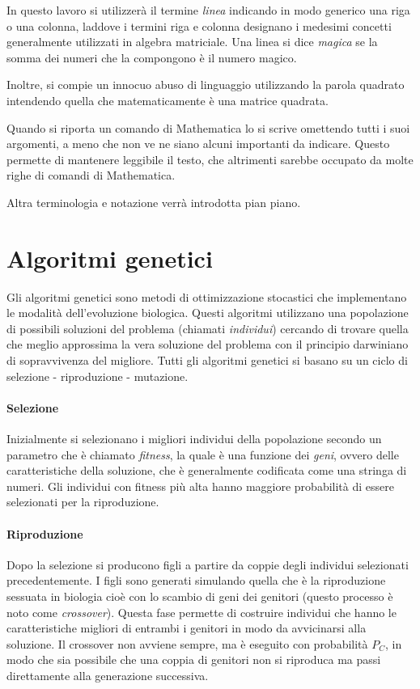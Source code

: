 \documentclass[italian,twoside,twocolumn]{article}
\begin{document}
In questo lavoro si utilizzerà il termine \emph{linea} indicando in modo generico una riga o una colonna, laddove i termini riga e colonna designano i medesimi concetti generalmente utilizzati in algebra matriciale. Una linea si dice \emph{magica} se la somma dei numeri che la compongono è il numero magico. 

Inoltre, si compie un innocuo abuso di linguaggio utilizzando la parola quadrato intendendo quella che matematicamente è una matrice quadrata. 

Quando si riporta un comando di Mathematica lo si scrive omettendo tutti i suoi argomenti, a meno che non ve ne siano alcuni importanti da indicare. Questo permette di mantenere leggibile il testo, che altrimenti sarebbe occupato da molte righe di comandi di Mathematica. 

Altra terminologia e notazione verrà introdotta pian piano.

\section{Algoritmi genetici}
Gli algoritmi genetici sono metodi di ottimizzazione stocastici che implementano le modalità dell'evoluzione biologica. Questi algoritmi utilizzano una popolazione di possibili soluzioni del problema (chiamati \emph{individui}) cercando di trovare quella che meglio approssima la vera soluzione del problema con il principio darwiniano di sopravvivenza del migliore. Tutti gli algoritmi genetici si basano su un ciclo di selezione - riproduzione - mutazione.
\paragraph{Selezione} Inizialmente si selezionano i migliori individui della popolazione secondo un parametro che è chiamato \emph{fitness}, la quale è una funzione dei \emph{geni}, ovvero delle caratteristiche della soluzione, che è generalmente codificata come una stringa di numeri. Gli individui con fitness più alta hanno maggiore probabilità di essere selezionati per la riproduzione.

\paragraph{Riproduzione} Dopo la selezione si producono figli a partire da coppie degli individui selezionati precedentemente. I figli sono generati simulando quella che è la riproduzione sessuata in biologia cioè con lo scambio di geni dei genitori (questo processo è noto come \emph{crossover}). Questa fase permette di costruire individui che hanno le caratteristiche migliori di entrambi i genitori in modo da avvicinarsi alla soluzione. Il crossover non avviene sempre, ma è eseguito con probabilità $ P_C $, in modo che sia possibile che una coppia di genitori non si riproduca ma passi direttamente alla generazione successiva.  
\end{document}
